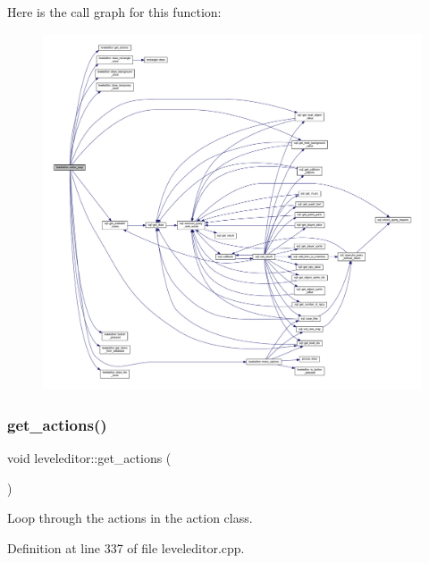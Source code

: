 Here is the call graph for this function\+:
\nopagebreak
\begin{figure}[H]
\begin{center}
\leavevmode
\includegraphics[width=350pt]{classleveleditor_a2ee968e4a8d305cdb1465397388b63f2_cgraph}
\end{center}
\end{figure}
\mbox{\label{classleveleditor_aa5cd17c0004af09a706230a93abb10ee}} 
\subsubsection{\texorpdfstring{get\+\_\+actions()}{get\_actions()}}
{\footnotesize\ttfamily void leveleditor\+::get\+\_\+actions (\begin{DoxyParamCaption}{ }\end{DoxyParamCaption})}



Loop through the actions in the action class. 



Definition at line 337 of file leveleditor.\+cpp.

